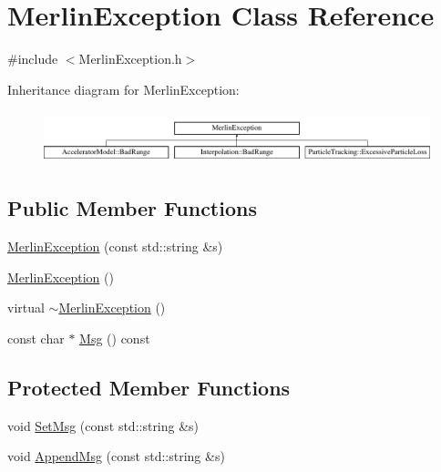 \hypertarget{classMerlinException}{}\section{Merlin\+Exception Class Reference}
\label{classMerlinException}


{\ttfamily \#include $<$Merlin\+Exception.\+h$>$}

Inheritance diagram for Merlin\+Exception\+:\begin{figure}[H]
\begin{center}
\leavevmode
\includegraphics[height=1.530055cm]{classMerlinException}
\end{center}
\end{figure}
\subsection*{Public Member Functions}
\begin{DoxyCompactItemize}
\item 
\hyperlink{classMerlinException_afddab52b70c55154ca28da753db48e02}{Merlin\+Exception} (const std\+::string \&s)
\item 
\hyperlink{classMerlinException_a3980e824be4eabd76fd2cbcbcd1e0bc0}{Merlin\+Exception} ()
\item 
virtual \hyperlink{classMerlinException_a211e13e8cb3d6cbdfcdad4ba9889a3d2}{$\sim$\+Merlin\+Exception} ()
\item 
const char $\ast$ \hyperlink{classMerlinException_a8f43d9799e86d593f1e2154a90972638}{Msg} () const
\end{DoxyCompactItemize}
\subsection*{Protected Member Functions}
\begin{DoxyCompactItemize}
\item 
void \hyperlink{classMerlinException_a51f0305351accf8471662e3fa8ba4e7f}{Set\+Msg} (const std\+::string \&s)
\item 
void \hyperlink{classMerlinException_a056d45fb247c29660580c9c1d350f245}{Append\+Msg} (const std\+::string \&s)
\end{DoxyCompactItemize}


